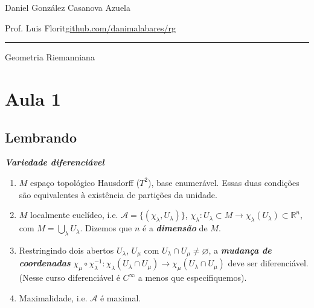 
\newcommand{\rightlooparrow}{\mathbin{
    \vbox{\openup-10.25pt\halign{\hss$##$\hss\cr\circ\cr\longrightarrow\cr}}
}}




\begin{minipage}{\textwidth}
	\begin{minipage}{1\textwidth}
		\hfill Daniel González Casanova Azuela
		
		{\small Prof. Luis Florit\hfill\href{https://github.com/danimalabares/rg}{github.com/danimalabares/rg}}
	\end{minipage}
\end{minipage}\vspace{.2cm}\hrule

\vspace{10pt}
{\huge Geometria Riemanniana}
\tableofcontents
\section{Aula 1}

\subsection{Lembrando}

\begin{defn}\leavevmode
\textit{\textbf{Variedade diferenciável}}
\begin{enumerate}
\item \(M\) espaço topológico Hausdorff (\(T^2\)), base enumerável. Essas duas condições são equivalentes à existência de partições da unidade.

\item \(M\) localmente euclídeo, i.e. \(\mathcal{A}=\{(\chi_\lambda,U_\lambda)\}\), \(\chi_\lambda:U_\lambda \subset M \to\chi_\lambda(U_\lambda)\subset \mathbb{R}^n\), com \(M=\bigcup_{\lambda}U_\lambda\). Dizemos que \(n\) é a \textit{\textbf{dimensão}} de \(M\).

\item Restringindo dois abertos \(U_\lambda\), \(U_\mu\) com \(U_\lambda \cap U_\mu \neq  \varnothing\), a \textit{\textbf{mudança de coordenadas}} \(\chi_\mu \circ \chi_\lambda^{-1}:\chi_\lambda(U_\lambda \cap U_\mu) \to \chi_\mu(U_\lambda \cap U_\mu)\) deve ser diferenciável. (Nesse curso diferenciável é \(C^\infty\) a menos que especifiquemos).

\item Maximalidade, i.e. \(\mathcal{A}\) é maximal.
\end{enumerate}
\end{defn}

